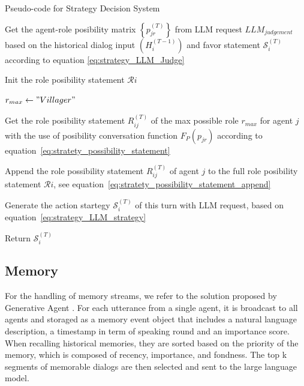 \documentclass[11pt]{article}
\begin{document}
\begin{algorithm*}[htbp]

  \renewcommand{\arraystretch}{1.3}
  \setlength{\tabcolsep}{10pt}

  \caption{Pseudo-code for Strategy Decision System}

  \label{alg:StrategyDecision}
  
  Get the agent-role posibility matrix $ \left\{ p_{jr}^{(T)} \right\} $ from LLM request $ LLM_{judgement} $ based on the historical dialog input $ (H_i^{(T-1)}) $ and favor statement $ \mathcal{S} _i^{(T)} $ according to equation \ref{eq:strategy_LLM_Judge} \;

  Init the role posibility statement $ \mathcal{R} i $ \;

   {
    
    $ r_{max} \leftarrow "Villager" $
      
     {
    }

    Get the role posibility statement $ R_{ij}^{(T)} $ of the max possible role $ r_{max} $ for agent $ j $ with the use of posibility conversation function $ F_P(p_{jr}) $ according to equation~\ref{eq:stratety_possibility_statement}

    Append the role possibility statement $ R_{ij}^{(T)}$ of agent $ j $ to the full role posibility statement $ \mathcal{R} i $, see equation~\ref{eq:stratety_possibility_statement_append}
  }

  Generate the action startegy $ \mathcal{S} _i^{(T)} $ of this turn with LLM request, based on equation~\ref{eq:strategy_LLM_strategy}

  Return $ \mathcal{S} _i^{(T)} $  

\end{algorithm*}


\subsection{Memory}

For the handling of memory streams, we refer to the solution proposed by Generative Agent \citep{park2023generative}. For each utterance from a single agent, it is broadcast to all agents and storaged as a memory event object that includes a natural language description, a timestamp in term of speaking round and an importance score. When recalling historical memories, they are sorted based on the priority of the memory, which is composed of recency, importance, and fondness. The top k segments of memorable dialogs are then selected and sent to the large language model.
\end{document}
